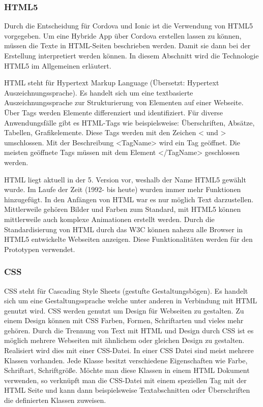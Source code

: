 \subsubsection{HTML5}

Durch die Entscheidung für Cordova und Ionic ist die Verwendung von HTML5 vorgegeben. Um eine Hybride App über Cordova erstellen lassen zu können, müssen die Texte in HTML-Seiten beschrieben werden. Damit sie dann bei der Erstellung interpretiert werden können. In diesem Abschnitt wird die Technologie HTML5 im Allgemeinen erläutert.

HTML steht für Hypertext Markup Language (Übersetzt: Hypertext Auszeichnungssprache). Es handelt sich um eine textbasierte Auszeichnungssprache zur Strukturierung von Elementen auf einer Webseite. 
Über Tags werden Elemente differenziert und identifiziert. Für diverse Anwendungsfälle gibt es HTML-Tags wie beispielsweise: Überschriften, Absätze, Tabellen, Grafikelemente.
Diese Tags werden mit den Zeichen < und > umschlossen. Mit der Beschreibung <TagName> wird ein Tag geöffnet.  Die meisten geöffnete Tags müssen mit dem Element </TagName> geschlossen werden. 

HTML liegt aktuell in der 5. Version vor, weshalb der Name HTML5 gewählt wurde. Im Laufe der Zeit (1992- bis heute) wurden immer mehr Funktionen hinzugefügt. In den Anfängen von HTML war es nur möglich Text darzustellen. Mittlerweile gehören Bilder und Farben zum Standard, mit HTML5 können mittlerweile auch komplexe Animationen erstellt werden.  Durch die Standardisierung von HTML durch das W3C können nahezu alle Browser in HTML5 entwickelte Webseiten anzeigen. Diese Funktionalitäten werden für den Prototypen verwendet.



\subsubsection{CSS}
CSS steht für Cascading Style Sheets (gestufte Gestaltungsbögen). Es handelt sich um eine Gestaltungssprache welche unter anderen in Verbindung mit HTML genutzt wird. CSS werden genutzt um Design für Webseiten zu gestalten. Zu einem Design können mit CSS Farben, Formen, Schriftarten und vieles mehr gehören. Durch die Trennung von Text mit HTML und Design durch CSS ist es möglich mehrere Webseiten mit ähnlichem oder gleichen Design zu gestalten. Realisiert wird dies mit einer CSS-Datei. In einer CSS Datei sind meist mehrere Klassen vorhanden. Jede Klasse besitzt verschiedene Eigenschaften wie Farbe, Schriftart, Schriftgröße. Möchte man diese Klassen in einem HTML Dokument verwenden, so verknüpft man die CSS-Datei mit einem speziellen Tag  mit der HTML Seite und kann dann beispielsweise Textabschnitten oder Überschriften die definierten Klassen zuweisen.

